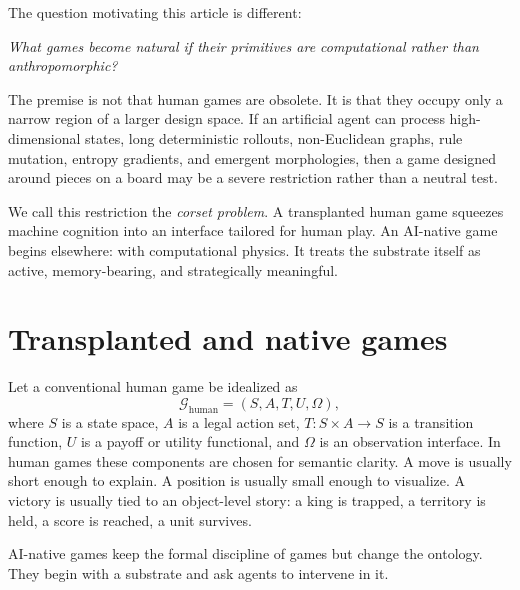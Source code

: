 \documentclass[11pt,a4paper]{article}
\theoremstyle{plain}
\theoremstyle{definition}
\newcommand{\G}{\mathcal{G}}
\begin{document}
The question motivating this article is different:
\begin{center}
  \emph{What games become natural if their primitives are computational rather than anthropomorphic?}
\end{center}
The premise is not that human games are obsolete. It is that they occupy only a narrow region of a larger design space. If an artificial agent can process high-dimensional states, long deterministic rollouts, non-Euclidean graphs, rule mutation, entropy gradients, and emergent morphologies, then a game designed around pieces on a board may be a severe restriction rather than a neutral test.

We call this restriction the \emph{corset problem}. A transplanted human game squeezes machine cognition into an interface tailored for human play. An AI-native game begins elsewhere: with computational physics. It treats the substrate itself as active, memory-bearing, and strategically meaningful.

\section{Transplanted and native games}\label{sec:transplanted-native}

Let a conventional human game be idealized as
\[
  \G_{\mathrm{human}}=(S,A,T,U,\Omega),
\]
where $S$ is a state space, $A$ is a legal action set, $T:S\times A\to S$ is a transition function, $U$ is a payoff or utility functional, and $\Omega$ is an observation interface. In human games these components are chosen for semantic clarity. A move is usually short enough to explain. A position is usually small enough to visualize. A victory is usually tied to an object-level story: a king is trapped, a territory is held, a score is reached, a unit survives.

AI-native games keep the formal discipline of games but change the ontology. They begin with a substrate and ask agents to intervene in it.
\end{document}
